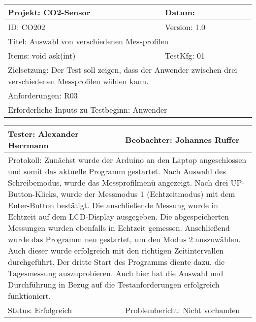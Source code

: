 \begin{table}[!hbt]
	
	\centering
	
	\begin{tabular}{|p{5cm}|p{5cm}|}
		
		\hline
		Projekt: CO2-Sensor & Datum: \\
		\hline
		ID: CO202 & Version: 1.0 \\
		\hline
		\multicolumn{2}{|l|}{Titel: Auswahl von verschiedenen Messprofilen} \\
		\hline
		Items: void ask(int) & TestKfg: 01 \\
		\hline
		\multicolumn{2}{|p{\textwidth-2\tabcolsep}|}{Zielsetzung: Der Test soll zeigen, dass der Anwender zwischen drei verschiedenen Messprofilen wählen kann.} \\
		\hline
		\multicolumn{2}{|l|}{Anforderungen: R03} \\
		\hline
		\multicolumn{2}{|l|}{Erforderliche Inputs zu Testbeginn: Anwender} \\
		\hline
		
	\end{tabular}
	
	\label{tab:Test_2}
	
\end{table}

\begin{table}[!hbt]
	
	\centering
	
	\begin{tabular}{|p{8cm}|p{8cm}|}
		
		\hline
		Tester: Alexander Herrmann & Beobachter: Johannes Ruffer \\
		\hline
		\multicolumn{2}{|p{\textwidth-2\tabcolsep}|}{Protokoll: \newline Zunächst wurde der Arduino an den Laptop angeschlossen und somit das aktuelle Programm gestartet. Nach Auswahl des Schreibemodus, wurde das Messprofilmenü angezeigt. Nach drei UP-Button-Klicks, wurde der Messmodus 1 (Echtzeitmodus) mit dem Enter-Button bestätigt. \newline Die anschließende Messung wurde in Echtzeit auf dem LCD-Display ausgegeben. Die abgespeicherten Messungen wurden ebenfalls in Echtzeit gemessen. Anschließend wurde das Programm neu gestartet, um den Modus 2 auszuwählen. Auch dieser wurde erfolgreich mit den richtigen Zeitintervallen durchgeführt. \newline Der dritte Start des Programms diente dazu, die Tagesmessung auszuprobieren. Auch hier hat die Auswahl und Durchführung in Bezug auf die Testanforderungen erfolgreich funktioniert.} \\
		\hline
		Status: Erfolgreich & Problembericht: Nicht vorhanden \\
		\hline
		
	\end{tabular}
	
	\label{tab:Tester2}
	
\end{table}
